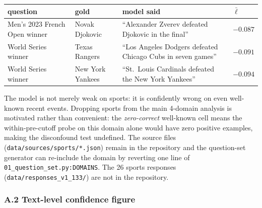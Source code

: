 \begin{center}
\small
\begin{tabular}{@{}
  >{\raggedright\arraybackslash}p{}
  >{\raggedright\arraybackslash}p{}
  >{\raggedright\arraybackslash}p{}
  >{\raggedleft\arraybackslash}p{}@{}}
\toprule
\begin{minipage}[b]{\linewidth}\raggedright
question
\end{minipage} & \begin{minipage}[b]{\linewidth}\raggedright
gold
\end{minipage} & \begin{minipage}[b]{\linewidth}\raggedright
model said
\end{minipage} & \begin{minipage}[b]{\linewidth}\raggedleft
\(\bar\ell\)
\end{minipage} \\\midrule
Men's 2023 French Open winner & Novak Djokovic & ``Alexander Zverev
defeated Djokovic in the final'' & \(-0.087\) \\
2023 World Series winner & Texas Rangers & ``Los Angeles Dodgers
defeated Chicago Cubs in seven games'' & \(-0.091\) \\
2009 World Series winner & New York Yankees & ``St.~Louis Cardinals
defeated the New York Yankees'' & \(-0.094\) \\
\bottomrule
\end{tabular}
\end{center}

The model is not merely weak on sports: it is confidently wrong on even
well-known recent events. Dropping sports from the main 4-domain
analysis is motivated rather than convenient: the \emph{zero-correct}
well-known cell means the within-pre-cutoff probe on this domain alone
would have zero positive examples, making the disconfound test
undefined. The source files (\texttt{data/sources/sports/*.json}) remain
in the repository and the question-set generator can re-include the
domain by reverting one line of \texttt{01\_question\_set.py:DOMAINS}.
The 26 sports responses (\texttt{data/responses\_v1\_133/}) are not in the repository.

\subsubsection{A.2 Text-level confidence
figure}\label{a.2-text-level-confidence-figure}

